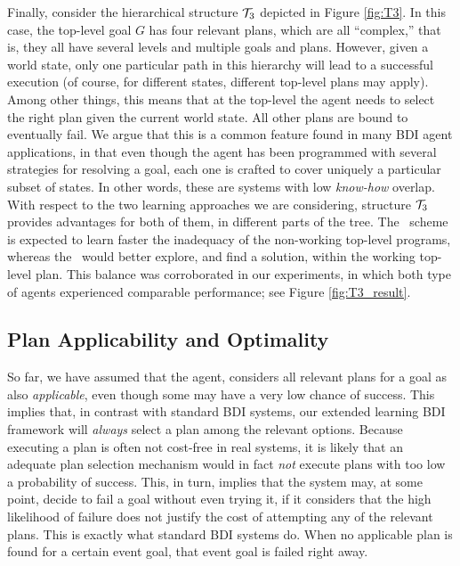 Finally, consider the hierarchical structure ${\mathcal{T}}_3$ depicted in Figure
\ref{fig:T3}.
In this case, the top-level goal $G$ has four relevant plans, which are all
``complex,'' that is, they all have several levels and multiple goals and plans.
However, given a world state, only one particular path in this hierarchy will
lead to a successful execution (of course, for different states, different
top-level plans may apply). Among other things, this means that at the top-level
the agent needs to select the right plan given the current world state. All 
other plans are bound to eventually fail.
We argue that this is a common feature found in many BDI agent applications, in
that even though the agent has been programmed with several strategies for
resolving a goal, each one is crafted to cover uniquely a particular subset of
states. In other words, these are systems with low \emph{know-how} overlap.
With respect to the two learning approaches we are considering, structure ${\mathcal{T}}_3$
provides advantages for both of them, in different parts of the tree. The \CL\
scheme is expected to learn faster the inadequacy of the non-working top-level
programs, whereas the \BUL\ would better explore, and find a solution, within the
working top-level plan. This balance was corroborated in our experiments, in
which both type of agents experienced comparable performance; see Figure
\ref{fig:T3_result}.




\subsection{Plan Applicability and Optimality}

So far, we have assumed that the agent, considers all relevant plans
for a goal as also \emph{applicable}, even though some may have a very
low chance of success.
This implies that, in contrast with standard BDI systems, our extended
learning BDI framework will \emph{always} select a plan among the relevant
options.
Because executing a plan is often not cost-free in real systems, it is likely
that an adequate plan selection mechanism would in fact \emph{not} execute plans
with too low a probability of success. This, in turn, implies that the system
may, at some point, decide to fail a goal without even trying it, if it
considers that the high likelihood of failure does not justify the
cost of attempting any of the relevant plans.
This is exactly what standard BDI systems do. When no applicable plan
is found for a certain event goal, that event goal is failed right away.


